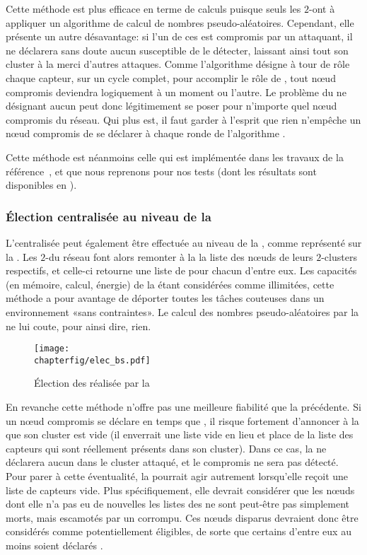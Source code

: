 Cette méthode est plus efficace en terme de calculs puisque seuls les $2$-\CH ont à appliquer un algorithme de calcul de nombres pseudo-aléatoires.
Cependant, elle présente un autre désavantage: si l'un de ces \CH est compromis par un attaquant, il ne déclarera sans doute aucun \cn susceptible de le détecter, laissant ainsi tout son cluster à la merci d'autres attaques.
Comme l'algorithme \leach désigne à tour de rôle chaque capteur, sur un cycle complet, pour accomplir le rôle de \CH, tout nœud compromis deviendra logiquement \CH à un moment ou l'autre.
Le problème du \CH ne désignant aucun \cn peut donc légitimement se poser pour n'importe quel nœud compromis du réseau.
Qui plus est, il faut garder à l'esprit que rien n'empêche un nœud compromis de se déclarer \ch à chaque ronde de l'algorithme \leach.

Cette méthode est néanmoins celle qui est implémentée dans les travaux de la référence~\cite{GMT12}, et que nous reprenons pour nos tests (dont les résultats sont disponibles en ).

        \subsubsection{Élection centralisée au niveau de la \sdb}
L'\election centralisée peut également être effectuée au niveau de la \sdb, comme représenté sur la .
Les $2$-\CH du réseau font alors remonter à la \sdb la liste des nœuds de leurs $2$-clusters respectifs, et celle-ci retourne une liste de \cns pour chacun d'entre eux.
Les capacités (en mémoire, calcul, énergie) de la \sdb étant considérées comme illimitées, cette méthode a pour avantage de déporter toutes les tâches couteuses dans un environnement «sans contraintes».
Le calcul des nombres pseudo-aléatoires par la \sdb ne lui coute, pour ainsi dire, rien.
\begin{figure}[ht]
    \centering
    \texttt{[image: \\chapterfig/elec\_bs.pdf]}
    \caption{Élection des \cns réalisée par la \sdb}\label{sa:fig:elecbs}
\end{figure}

En revanche cette méthode n'offre pas une meilleure fiabilité que la précédente.
Si un nœud compromis se déclare en temps que \CH, il risque fortement d'annoncer à la \sdb que son cluster est vide (il enverrait une liste vide en lieu et place de la liste des capteurs qui sont réellement présents dans son cluster).
Dans ce cas, la \sdb ne déclarera aucun \cn dans le cluster attaqué, et le \CH compromis ne sera pas détecté.
Pour parer à cette éventualité, la \sdb pourrait agir autrement lorsqu'elle reçoit une liste de capteurs vide.
Plus spécifiquement, elle devrait considérer que les nœuds dont elle n'a pas eu de nouvelles \via les listes des \CH ne sont peut-être pas simplement morts, mais escamotés par un \ch corrompu.
Ces nœuds disparus devraient donc être considérés comme potentiellement éligibles, de sorte que certains d'entre eux au moins soient déclarés \cns.

